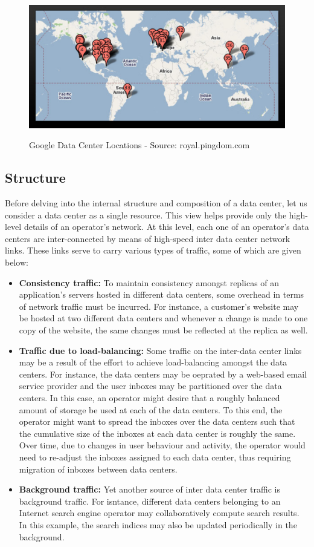 \begin{figure}
\includegraphics[width=1\textwidth]{pics/googledcmap.eps}
\label{fig:googledcmap}
\caption{Google Data Center Locations - Source: royal.pingdom.com}
\end{figure}
\subsection{Structure}
Before delving into the internal structure and composition of a data center, let us consider a data center as a single resource. This view helps provide only the high-level details of an operator's network. At this level, each one of an operator's data centers are inter-connected by means of high-speed inter data center network links. These links serve to carry various types of traffic, some of which are given below:
\begin{itemize}
\item \textbf{Consistency traffic:} To maintain consistency amongst replicas of an application's servers hosted in different data centers, some overhead in terms of network traffic must be incurred. For instance, a customer's website may be hosted at two different data centers and whenever a change is made to one copy of the website, the same changes must be reflected at the replica as well. 
\item \textbf{Traffic due to load-balancing:} Some traffic on the inter-data center links may be a result of the effort to achieve load-balancing amongst the data centers. For instance, the data centers may be oeprated by a web-based email service provider and the user inboxes may be partitioned over the data centers. In this case, an operator might desire that a roughly balanced amount of storage be used at each of the data centers. To this end, the operator might want to spread the inboxes over the data centers such that the cumulative size of the inboxes at each data center is roughly the same. Over time, due to changes in user behaviour and activity, the operator would need to re-adjust the inboxes assigned to each data center, thus requiring migration of inboxes between data centers. 
\item \textbf{Background traffic:} Yet another source of inter data center traffic is background traffic. For isntance, different data centers belonging to an Internet search engine operator may collaboratively compute search results. In this example, the search indices may also be updated periodically in the background.
\end{itemize}

